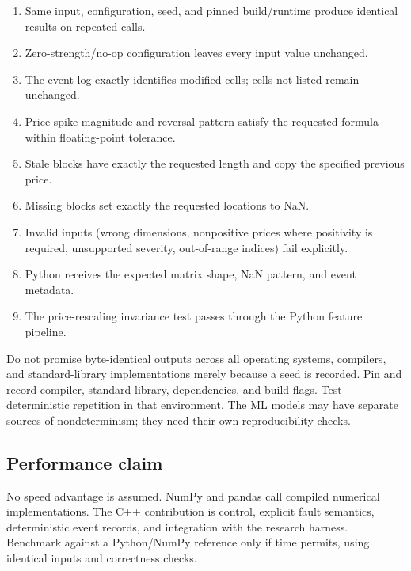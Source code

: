\documentclass[11pt,a4paper]{article}
\begin{document}
\begin{enumerate}
  \item Same input, configuration, seed, and pinned build/runtime produce identical results on repeated calls.
  \item Zero-strength/no-op configuration leaves every input value unchanged.
  \item The event log exactly identifies modified cells; cells not listed remain unchanged.
  \item Price-spike magnitude and reversal pattern satisfy the requested formula within floating-point tolerance.
  \item Stale blocks have exactly the requested length and copy the specified previous price.
  \item Missing blocks set exactly the requested locations to NaN.
  \item Invalid inputs (wrong dimensions, nonpositive prices where positivity is required, unsupported severity, out-of-range indices) fail explicitly.
  \item Python receives the expected matrix shape, NaN pattern, and event metadata.
  \item The price-rescaling invariance test passes through the Python feature pipeline.
\end{enumerate}

\begin{warningbox}
Do not promise byte-identical outputs across all operating systems, compilers, and standard-library implementations merely because a seed is recorded. Pin and record compiler, standard library, dependencies, and build flags. Test deterministic repetition in that environment. The ML models may have separate sources of nondeterminism; they need their own reproducibility checks.
\end{warningbox}

\subsection{Performance claim}

No speed advantage is assumed. NumPy and pandas call compiled numerical implementations. The C++ contribution is control, explicit fault semantics, deterministic event records, and integration with the research harness. Benchmark against a Python/NumPy reference only if time permits, using identical inputs and correctness checks.

\end{document}
